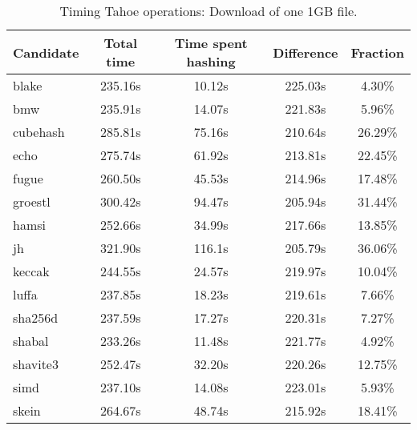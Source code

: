 \begin{table}[h]
  \centering
  \begin{tabular}{ | l | c | c | c | c | }
    \hline
    Candidate & Total time & Time spent hashing & Difference & Fraction \\ \hline
    blake & 235.16s & 10.12s & 225.03s & 4.30\% \\ \hline
    bmw & 235.91s & 14.07s & 221.83s & 5.96\% \\ \hline
    cubehash & 285.81s & 75.16s & 210.64s & 26.29\% \\ \hline
    echo & 275.74s & 61.92s & 213.81s & 22.45\% \\ \hline
    fugue & 260.50s & 45.53s & 214.96s & 17.48\% \\ \hline
    groestl & 300.42s & 94.47s & 205.94s & 31.44\% \\ \hline
    hamsi & 252.66s & 34.99s & 217.66s & 13.85\% \\ \hline
    jh & 321.90s & 116.1s & 205.79s & 36.06\% \\ \hline
    keccak & 244.55s & 24.57s & 219.97s & 10.04\% \\ \hline
    luffa & 237.85s & 18.23s & 219.61s & 7.66\% \\ \hline
    sha256d & 237.59s & 17.27s & 220.31s & 7.27\% \\ \hline
    shabal & 233.26s & 11.48s & 221.77s & 4.92\% \\ \hline
    shavite3 & 252.47s & 32.20s & 220.26s & 12.75\% \\ \hline
    simd & 237.10s & 14.08s & 223.01s & 5.93\% \\ \hline
    skein & 264.67s & 48.74s & 215.92s & 18.41\% \\ \hline
  \end{tabular}
  \caption{Timing Tahoe operations: Download of one 1GB file.}
  \label{tbl:hashingtimes:get1gb}
\end{table}
